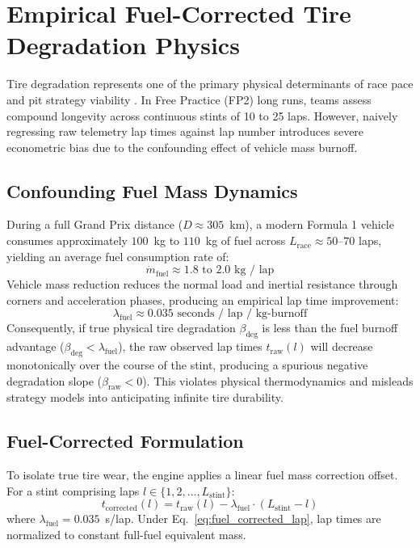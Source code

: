 \section{Empirical Fuel-Corrected Tire Degradation Physics}
\label{sec:tire_physics_degradation}

Tire degradation represents one of the primary physical determinants of race pace and pit strategy viability \cite{bekker2009stochastic}. In Free Practice (FP2) long runs, teams assess compound longevity across continuous stints of 10 to 25 laps. However, naively regressing raw telemetry lap times against lap number introduces severe econometric bias due to the confounding effect of vehicle mass burnoff.

\subsection{Confounding Fuel Mass Dynamics}
During a full Grand Prix distance ($D \approx 305$~km), a modern Formula 1 vehicle consumes approximately $100$~kg to $110$~kg of fuel across $L_{\text{race}} \approx 50$--$70$ laps, yielding an average fuel consumption rate of:
\begin{equation}
\dot{m}_{\text{fuel}} \approx 1.8 \text{ to } 2.0 \text{ kg / lap}
\end{equation}
Vehicle mass reduction reduces the normal load and inertial resistance through corners and acceleration phases, producing an empirical lap time improvement:
\begin{equation}
\lambda_{\text{fuel}} \approx 0.035 \text{ seconds / lap / kg-burnoff}
\end{equation}
Consequently, if true physical tire degradation $\beta_{\text{deg}}$ is less than the fuel burnoff advantage ($\beta_{\text{deg}} < \lambda_{\text{fuel}}$), the raw observed lap times $t_{\text{raw}}(l)$ will decrease monotonically over the course of the stint, producing a spurious negative degradation slope ($\beta_{\text{raw}} < 0$). This violates physical thermodynamics and misleads strategy models into anticipating infinite tire durability.

\subsection{Fuel-Corrected Formulation}
To isolate true tire wear, the engine applies a linear fuel mass correction offset. For a stint comprising laps $l \in \{1, 2, \dots, L_{\text{stint}}\}$:
\begin{equation}
t_{\text{corrected}}(l) = t_{\text{raw}}(l) - \lambda_{\text{fuel}} \cdot (L_{\text{stint}} - l)
\label{eq:fuel_corrected_lap}
\end{equation}
where $\lambda_{\text{fuel}} = 0.035$~s/lap. Under Eq.~\eqref{eq:fuel_corrected_lap}, lap times are normalized to constant full-fuel equivalent mass.

